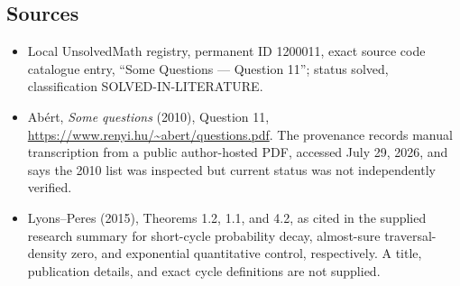 \documentclass[11pt]{article}
\begin{document}
\subsection{Sources}
\begin{itemize}
\item Local UnsolvedMath registry, permanent ID 1200011, exact source code catalogue entry, ``Some Questions --- Question 11''; status solved, classification SOLVED-IN-LITERATURE.
\item Ab\'ert, \emph{Some questions} (2010), Question 11, \url{https://www.renyi.hu/~abert/questions.pdf}. The provenance records manual transcription from a public author-hosted PDF, accessed July 29, 2026, and says the 2010 list was inspected but current status was not independently verified.
\item Lyons--Peres (2015), Theorems 1.2, 1.1, and 4.2, as cited in the supplied research summary for short-cycle probability decay, almost-sure traversal-density zero, and exponential quantitative control, respectively. A title, publication details, and exact cycle definitions are not supplied.
\end{itemize}
\end{document}
